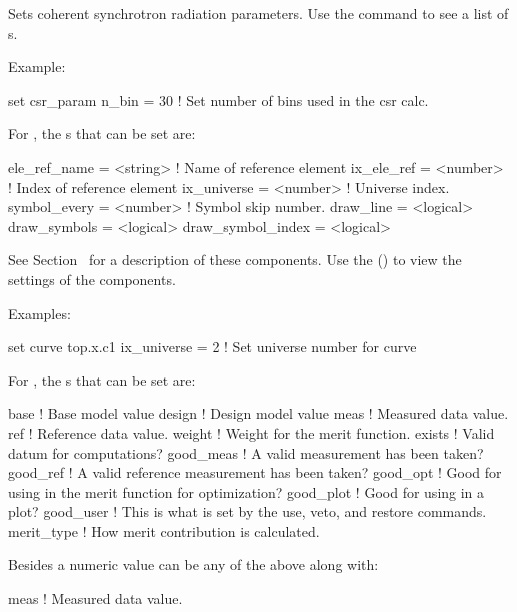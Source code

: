 {{\begin{description}
Sets coherent synchrotron radiation parameters. Use the  command to see a list of s.

Example:
\begin{example}
  set csr_param n_bin = 30  ! Set number of bins used in the csr calc.
\end{example}


\item[set curve <curve> <component> = <value>] \Newline

\vskip -0.2in

For , the s that can be set are:
\begin{example}
  ele_ref_name      = <string>  ! Name of reference element
  ix_ele_ref        = <number>  ! Index of reference element
  ix_universe       = <number>  ! Universe index.
  symbol_every      = <number>  ! Symbol skip number.
  draw_line         = <logical> 
  draw_symbols      = <logical> 
  draw_symbol_index = <logical> 
\end{example}
See Section~ for a description of these components.
Use the  () to view the settings of the
components.

Examples:
\begin{example}
  set curve top.x.c1 ix_universe = 2  ! Set universe number for curve
\end{example}


\item[set data <data\_name>|<component> = <value>] \Newline

\vskip -0.2in

For , the s that can be set are:
\begin{example}
  base        ! Base model value
  design      ! Design model value
  meas        ! Measured data value.
  ref         ! Reference data value.
  weight      ! Weight for the merit function.
  exists      ! Valid datum for computations?
  good_meas   ! A valid measurement has been taken?
  good_ref    ! A valid reference measurement has been taken?
  good_opt    ! Good for using in the merit function for optimization?
  good_plot   ! Good for using in a plot?
  good_user   ! This is what is set by the use, veto, and restore commands.
  merit_type  ! How merit contribution is calculated.
\end{example}
Besides a numeric value  can be any of the above along with:
\begin{example}
  meas        ! Measured data value.
\end{example}


\end{description}}}
